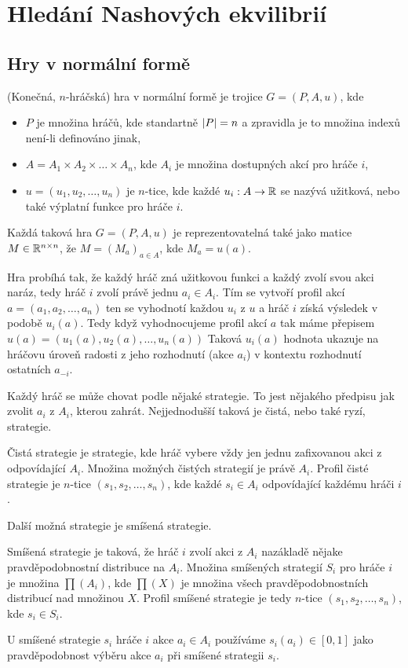 \section{Hledání Nashových ekvilibrií}
\subsection{Hry v normální formě}
\begin{definition}
\label{def:normal_form_game}
(Konečná, $n$-hráčská) hra v normální formě je trojice $G = (P, A, u)$, kde 
\begin{itemize}
    \item $P$ je množina hráčů, kde standartně $\left|P\right| = n$ a zpravidla je to množina indexů není-li definováno jinak,
    \item $A = A_1 \times A_2 \times \dots \times A_n$, kde $A_i$ je množina dostupných akcí pro hráče $i$,\item $u = (u_1, u_2, \dots, u_n)$ je $n$-tice, kde každé $u_i: A \rightarrow \mathbb{R}$ se nazývá užitková, nebo také výplatní funkce pro hráče $i$.
\end{itemize}
Každá taková hra $G = (P,A,u)$ je reprezentovatelná také jako matice $M \in \mathbb{R}^{n \times n}$, že $M = (M_a)_{a\in A}$, kde $M_a = u(a)$.
\end{definition}
Hra probíhá tak, že každý hráč zná užitkovou funkci a každý zvolí svou akci naráz, tedy hráč $i$ zvolí právě jednu $a_i \in A_i$. 
Tím se vytvoří profil akcí $a = (a_1, a_2, \dots, a_n)$ ten se vyhodnotí každou $u_i$ z $u$ a hráč $i$ získá výsledek v podobě $u_i(a)$. 
Tedy když vyhodnocujeme profil akcí $a$ tak máme přepisem $u(a) = (u_1(a), u_2(a), \dots, u_n(a))$
Taková $u_i(a)$ hodnota ukazuje na hráčovu úroveň radosti z jeho rozhodnutí (akce $a_i$) v kontextu rozhodnutí ostatních $a_{-i}$. 

Každý hráč se může chovat podle nějaké strategie. To jest nějakého předpisu jak zvolit $a_i$ z $A_i$, kterou zahrát. Nejjednodušší taková je čistá, nebo také ryzí, strategie.
\begin{definition}
\label{def:pure_strategy}
Čistá strategie je strategie, kde hráč vybere vždy jen jednu zafixovanou akci z odpovídající $A_i$. Množina možných čistých strategií je právě $A_i$. Profil čisté strategie je $n$-tice $(s_1, s_2, \dots, s_n)$, kde každé $s_i \in A_i$ odpovídající každému hráči $i$.
\end{definition}
Další možná strategie je smíšená strategie. 
\begin{definition}
\label{def:mixed_strategy}
Smíšená strategie je taková, že hráč $i$ zvolí akci z $A_i$ nazákladě nějake pravděpodobnostní distribuce na $A_i$. Množina smíšených strategií $S_i$ pro hráče $i$ je množina $\prod (A_i)$, kde $\prod(X)$ je množina všech pravděpodobnostních distribucí nad množinou $X$. Profil smíšené strategie je tedy $n$-tice $(s_1, s_2, \dots, s_n)$, kde $s_i \in S_i$. 
\end{definition}
U smíšené strategie $s_i$ hráče $i$ akce $a_i \in A_i$ používáme $s_i(a_i) \in [0,1]$ jako pravděpodobnost výběru akce $a_i$ při smíšené strategii $s_i$. 


